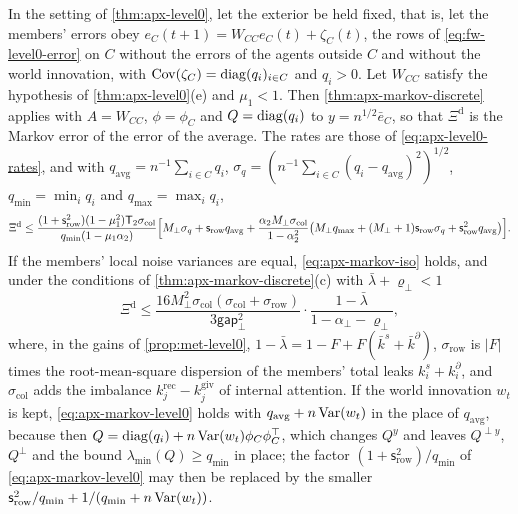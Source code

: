 \begin{corollary}\label{cor:apx-markov-level0}
In the setting of \cref{thm:apx-level0}, let the exterior be held fixed, that is, let the members' errors obey $e_C(t+1)=W_{CC}e_C(t)+\zeta_C(t)$, the rows of \eqref{eq:fw-level0-error} on $C$ without the errors of the agents outside $C$ and without the world innovation, with $\operatorname{Cov}(\zeta_C)=\operatorname{diag}(q_i)_{i\in C}$ and $q_i>0$. Let $W_{CC}$ satisfy the hypothesis of \cref{thm:apx-level0}(e) and $\mu_1<1$. Then \cref{thm:apx-markov-discrete} applies with $A=W_{CC}$, $\phi=\phi_C$ and $Q=\operatorname{diag}(q_i)$ to $y=n^{1/2}\bar e_C$, so that $\Xi^{\mathrm d}$ is the Markov error of the error of the average. The rates are those of \eqref{eq:apx-level0-rates}, and with $q_{\mathrm{avg}}=n^{-1}\sum_{i\in C}q_i$, $\sigma_q=(n^{-1}\sum_{i\in C}(q_i-q_{\mathrm{avg}})^2)^{1/2}$, $q_{\min}=\min_iq_i$ and $q_{\max}=\max_iq_i$,
\begin{equation}\label{eq:apx-markov-level0}
\Xi^{\mathrm d}\le\frac{(1+\mathsf s_{\mathrm{row}}^2)(1-\mu_1^2)\mathsf T_2\sigma_{\mathrm{col}}}{q_{\min}(1-\mu_1\alpha_2)}\Bigl[M_\perp\sigma_q+\mathsf s_{\mathrm{row}}q_{\mathrm{avg}}+\frac{\alpha_2M_\perp\sigma_{\mathrm{col}}}{1-\alpha_2^2}\bigl(M_\perp q_{\max}+(M_\perp+1)\mathsf s_{\mathrm{row}}\sigma_q+\mathsf s_{\mathrm{row}}^2q_{\mathrm{avg}}\bigr)\Bigr].
\end{equation}
If the members' local noise variances are equal, \eqref{eq:apx-markov-iso} holds, and under the conditions of \cref{thm:apx-markov-discrete}(c) with $\bar\lambda+\varrho_\perp<1$
\begin{equation*}
\Xi^{\mathrm d}\le\frac{16M_\perp^2\sigma_{\mathrm{col}}(\sigma_{\mathrm{col}}+\sigma_{\mathrm{row}})}{3\mathsf{gap}_\perp^2}\cdot\frac{1-\bar\lambda}{1-\alpha_\perp-\varrho_\perp},
\end{equation*}
where, in the gains of \cref{prop:met-level0}, $1-\bar\lambda=1-F+F(\bar k^s+\bar k^\partial)$, $\sigma_{\mathrm{row}}$ is $\lvert F\rvert$ times the root-mean-square dispersion of the members' total leaks $k^s_i+k^\partial_i$, and $\sigma_{\mathrm{col}}$ adds the imbalance $k^{\mathrm{rec}}_j-k^{\mathrm{giv}}_j$ of internal attention. If the world innovation $w_t$ is kept, \eqref{eq:apx-markov-level0} holds with $q_{\mathrm{avg}}+n\operatorname{Var}(w_t)$ in the place of $q_{\mathrm{avg}}$, because then $Q=\operatorname{diag}(q_i)+n\operatorname{Var}(w_t)\phi_C\phi_C^\top$, which changes $Q^y$ and leaves $Q^{\perp y}$, $Q^\perp$ and the bound $\lambda_{\min}(Q)\ge q_{\min}$ in place; the factor $(1+\mathsf s_{\mathrm{row}}^2)/q_{\min}$ of \eqref{eq:apx-markov-level0} may then be replaced by the smaller $\mathsf s_{\mathrm{row}}^2/q_{\min}+1/(q_{\min}+n\operatorname{Var}(w_t))$.
\end{corollary}

